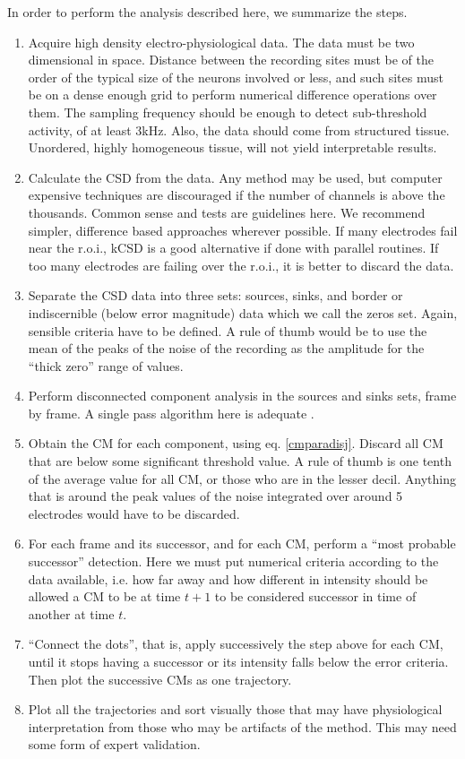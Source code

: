 \documentclass[12pt]{article}
\begin{document}
 In order to perform the analysis described here, we summarize the steps.
 \begin{enumerate}
 \item Acquire high density electro-physiological data. The data must be two
   dimensional
   in space. Distance between the recording sites must be of the order of the typical
   size of the neurons involved or less, and such sites must be on a dense enough grid to perform numerical difference operations over them.
   The sampling frequency should be enough to detect sub-threshold activity,
   of at least 3kHz. Also, the data should come from structured tissue.
   Unordered, highly homogeneous tissue, will not yield interpretable results. 
 \item Calculate the CSD from the data. Any method may be used,
   but computer expensive techniques are discouraged if the
   number of channels is above the thousands.
   Common sense and tests are guidelines here.
   We recommend simpler, difference based approaches wherever possible.
   If many electrodes fail near the r.o.i.,
   kCSD is a good alternative if done with
   parallel routines.
   If too many electrodes are failing over the r.o.i.,
   it is better to discard the data. 
 \item Separate the CSD data into three sets: sources, sinks, and border or indiscernible (below error magnitude) data
   which we call the zeros set. Again, sensible criteria have to be defined.
   A rule of thumb would be to use the mean of the peaks of the noise  of the recording as the amplitude for the ``thick zero'' range of values. 
\item Perform disconnected component analysis in the sources and sinks sets, frame by frame.
  A single pass algorithm here is  adequate \cite{Vincent91, Abubaker07}.
\item  Obtain the CM for each component, using eq. \ref{cmparadisj}. Discard
  all CM that are below some significant threshold value. A rule of thumb is one tenth of the average value for all CM,
  or those who are in the lesser decil. Anything that is around the peak
  values of the noise integrated over around 5 electrodes would have to be discarded.
\item For each frame and its successor, and for each CM, perform a ``most probable successor'' detection. Here we must put numerical criteria according to the data available, i.e. how far away and how different in intensity should be allowed a CM to be at time $t+1$ to be considered successor in time of another at time $t$.
\item ``Connect the dots'', that is, apply successively the step above for each CM, until it stops having a successor or its intensity falls below the error criteria. Then plot the successive CMs as one trajectory.
\item Plot all the trajectories and sort visually those that may have physiological interpretation from those who may be artifacts of the method. This may need some form of expert validation.
 \end{enumerate}
 
\end{document}
